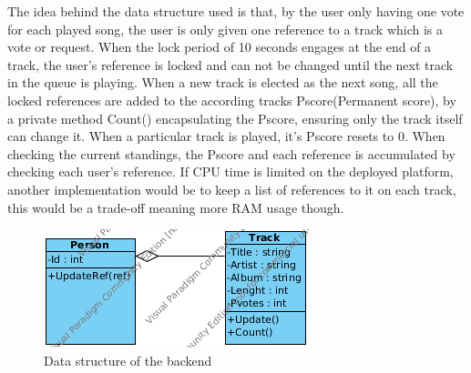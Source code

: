 The idea behind the data structure used is that, by the user only having one vote for each played song, the user is only given one reference to a track which is a vote or request. When the lock period of 10 seconds engages at the end of a track, the user's reference is locked and can not be changed until the next track in the queue is playing. When a new track is elected as the next song, all the locked references are added to the according tracks Pscore(Permanent score), by a private method Count() encapsulating the Pscore, ensuring only the track itself can change it. When a particular track is played, it's Pscore resets to 0. When checking the current standings, the Pscore and each reference is accumulated by checking each user's reference. If CPU time is limited on the deployed platform, another implementation would be to keep a list of references to it on each track, this would be a trade-off meaning more RAM usage though.

\begin{figure}
  \centering
  \includegraphics[width=0.5\linewidth]{Images/BackendDSv1.png}
  \caption{Data structure of the backend}
  \label{fig:backendDS}
\end{figure}